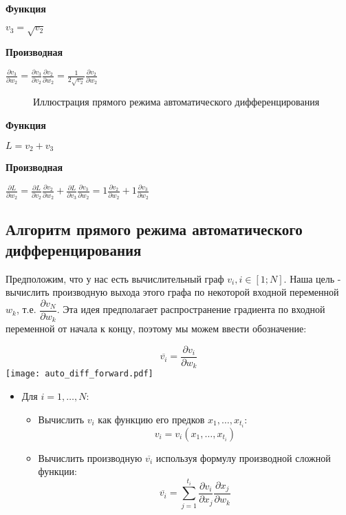 \documentclass[
  russian,
  letterpaper,
  DIV=11,
  numbers=noendperiod]{scrartcl}
\makeatletter
\newcommand*\pandocbounded[1]{%
  \sbox\pandoc@box{#1}%
  \Gscale@div\@tempa{\textheight}{\dimexpr\ht\pandoc@box+\dp\pandoc@box\relax}%
  \Gscale@div\@tempb{\linewidth}{\wd\pandoc@box}%
  \ifdim\@tempb\p@<\@tempa\p@\let\@tempa\@tempb\fi%
  \ifdim\@tempa\p@<\p@\scalebox{\@tempa}{\usebox\pandoc@box}%
  \else\usebox{\pandoc@box}%
  \fi%
}
\providecommand{\tightlist}{%
  \setlength{\itemsep}{0pt}\setlength{\parskip}{0pt}}
\makeatother
\begin{document}
\textbf{Функция}

\(v_3 = \sqrt{v_2}\)

\textbf{Производная}

\(\frac{\partial v_3}{\partial w_2} = \frac{\partial v_3}{\partial v_2}\frac{\partial v_2}{\partial w_2} = \frac{1}{2\sqrt{v_2}}\frac{\partial v_2}{\partial w_2}\)

\begin{figure}[H]

{\centering \pandocbounded{\texttt{[image: cgraph\_ex\_5.pdf]}}

}

\caption{Иллюстрация прямого режима автоматического дифференцирования}

\end{figure}%

\textbf{Функция}

\(L = v_2 + v_3\)

\textbf{Производная}

\(\frac{\partial L}{\partial w_2} = \frac{\partial L}{\partial v_2}\frac{\partial v_2}{\partial w_2} + \frac{\partial L}{\partial v_3}\frac{\partial v_3}{\partial w_2} = 1\frac{\partial v_2}{\partial w_2} + 1\frac{\partial v_3}{\partial w_2}\)

\subsection{Алгоритм прямого режима автоматического
дифференцирования}\label{ux430ux43bux433ux43eux440ux438ux442ux43c-ux43fux440ux44fux43cux43eux433ux43e-ux440ux435ux436ux438ux43cux430-ux430ux432ux442ux43eux43cux430ux442ux438ux447ux435ux441ux43aux43eux433ux43e-ux434ux438ux444ux444ux435ux440ux435ux43dux446ux438ux440ux43eux432ux430ux43dux438ux44f}

Предположим, что у нас есть вычислительный граф \(v_i, i \in [1; N]\).
Наша цель - вычислить производную выхода этого графа по некоторой
входной переменной \(w_k\), т.е. \(\dfrac{\partial v_N}{\partial w_k}\).
Эта идея предполагает распространение градиента по входной переменной от
начала к концу, поэтому мы можем ввести обозначение:

\[
\overline{v_i} = \dfrac{\partial v_i}{\partial w_k}
\]
\texttt{[image: auto\_diff\_forward.pdf]}

\begin{itemize}
\tightlist
\item
  Для \(i = 1, \ldots, N\):

  \begin{itemize}
  \tightlist
  \item
    Вычислить \(v_i\) как функцию его предков \(x_1, \ldots, x_{t_i}\):
    \[
      v_i = v_i(x_1, \ldots, x_{t_i})
      \]
  \item
    Вычислить производную \(\overline{v_i}\) используя формулу
    производной сложной функции: \[
      \overline{v_i} = \sum_{j = 1}^{t_i}\dfrac{\partial v_i}{\partial x_j}\dfrac{\partial x_j}{\partial w_k}
      \]
  \end{itemize}
\end{itemize}
\end{document}

